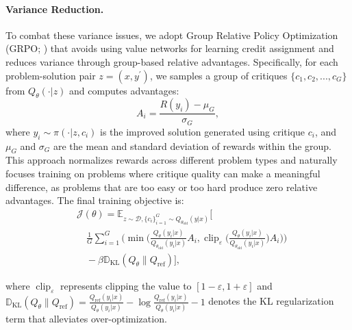 \paragraph{Variance Reduction.}
To combat these variance issues, we adopt Group Relative Policy Optimization (GRPO; \citealt{shao2024deepseekmath}) that avoids using value networks for learning credit assignment and reduces variance through group-based relative advantages. Specifically, for each problem-solution pair $z=(x,y^\prime)$, we samples a group of critiques $\{c_1, c_2, ..., c_G\}$ from $Q_\theta(\cdot|z)$ and computes advantages:
\begin{equation*}
    A_i = \frac{R(y_i) - \mu_G}{\sigma_G},
\end{equation*}
where $y_i \sim \pi(\cdot|z,c_i)$ is the improved solution generated using critique $c_i$, and $\mu_G$ and $\sigma_G$ are the mean and standard deviation of rewards within the group.
This approach normalizes rewards across different problem types and naturally focuses training on problems where critique quality can make a meaningful difference, as problems that are too easy or too hard produce zero relative advantages.
The final training objective is:
\begin{equation*}
\begin{aligned}
    &\mathcal{J}(\theta) = \mathbb{E}_{z \sim \mathcal{D}, \{c_i\}_{i=1}^G \sim Q_{\theta_{\text{old}}}(y|x)} \Big[ \\
    &\quad\frac{1}{G} \sum_{i=1}^G \Big(\min\big(\frac{Q_\theta(y_i|x)}{Q_{\theta_{\text{old}}}(y_i|x)}A_i, \operatorname{clip}_\varepsilon \big(\frac{Q_\theta(y_i|x)}{Q_{\theta_{\text{old}}}(y_i|x)}\big)A_i\big)\Big) \\
    &\quad- \beta\mathbb{D}_{\text{KL}}(Q_\theta\|Q_{\text{ref}})\Big],
\end{aligned}
\end{equation*}

where $\operatorname{clip}_\varepsilon$ represents clipping the value to $[1-\varepsilon, 1+\varepsilon]$ and $\mathbb{D}_{\text{KL}}(Q_\theta\|Q_{\text{ref}}) = \frac{Q_{\text{ref}}(y_i|x)}{Q_\theta(y_i|x)} - \log\frac{Q_{\text{ref}}(y_i|x)}{Q_\theta(y_i|x)} - 1$ denotes the KL regularization term that alleviates over-optimization.


